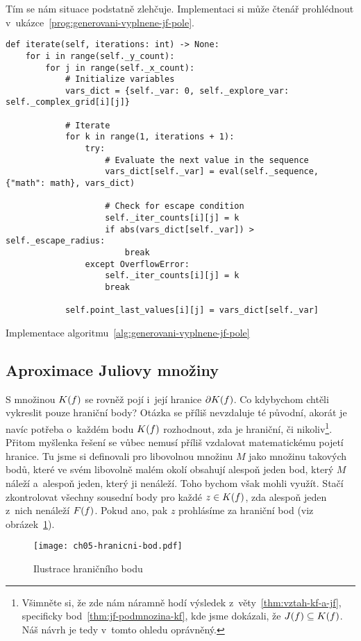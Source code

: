 Tím se nám situace podstatně zlehčuje. Implementaci si může čtenář prohlédnout v~ukázce~\ref{prog:generovani-vyplnene-jf-pole}.
\begin{program}[h]
\begin{lstlisting}[style=python]
def iterate(self, iterations: int) -> None:
    for i in range(self._y_count):
        for j in range(self._x_count):
            # Initialize variables
            vars_dict = {self._var: 0, self._explore_var: self._complex_grid[i][j]}

            # Iterate
            for k in range(1, iterations + 1):
                try:
                    # Evaluate the next value in the sequence
                    vars_dict[self._var] = eval(self._sequence, {"math": math}, vars_dict)

                    # Check for escape condition
                    self._iter_counts[i][j] = k
                    if abs(vars_dict[self._var]) > self._escape_radius:
                        break
                except OverflowError:
                    self._iter_counts[i][j] = k
                    break
            
            self.point_last_values[i][j] = vars_dict[self._var]
\end{lstlisting}
    \caption{Implementace algoritmu~\ref{alg:generovani-vyplnene-jf-pole}}
    \label{prog:generovani-vyplnene-jf-pole}
\end{program}

\subsection{Aproximace Juliovy množiny}\label{subsec:aproximace-juliovy-mnoziny}

S množinou $K(f)$ se rovněž pojí i~její hranice $\partial K(f)$. Co kdybychom chtěli vykreslit pouze hraniční body? Otázka se příliš nevzdaluje té původní, akorát je navíc potřeba o~každém bodu $K(f)$ rozhodnout, zda je hraniční, či nikoliv\footnote{Všimněte si, že zde nám náramně hodí výsledek z~věty~\ref{thm:vztah-kf-a-jf}, specificky bod~\ref{thm:jf-podmnozina-kf}, kde jsme dokázali, že $J(f)\subseteq K(f)$. Náš návrh je tedy v~tomto ohledu oprávněný.}. Přitom myšlenka řešení se vůbec nemusí příliš vzdalovat matematickému pojetí hranice. Tu jsme si definovali pro libovolnou množinu $M$ jako množinu takových bodů, které ve svém libovolně malém okolí obsahují alespoň jeden bod, který $M$ náleží a~alespoň jeden, který ji nenáleží. Toho bychom však mohli využít. Stačí zkontrolovat všechny sousední body pro každé $z\in K(f)$, zda alespoň jeden z~nich nenáleží $F(f)$. Pokud ano, pak $z$ prohlásíme za hraniční bod (viz obrázek~\ref{fig:hranicni-bod}).
\begin{figure}[h]
    \centering
    \texttt{[image: ch05-hranicni-bod.pdf]}
    \caption{Ilustrace hraničního bodu}
    \label{fig:hranicni-bod}
\end{figure}

